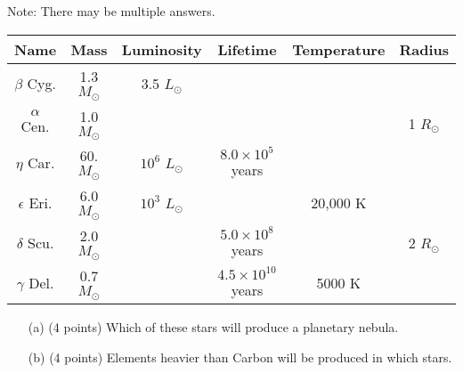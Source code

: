 \documentclass[12pt]{article}
\begin{document}
\begin{enumerate}
Note: There may be multiple answers.

\begin{tabular}{|c|c|c|c|c|c|}
\hline
Name & Mass & Luminosity & Lifetime & Temperature & Radius \\
\hline
$\beta$ Cyg. & 1.3 $M_\odot$ & 3.5 $L_\odot$ &  &  &  \\
\hline
$\alpha$ Cen. & 1.0 $M_\odot$ &  &  &  & 1 $R_\odot$ \\
\hline
$\eta$ Car. & 60. $M_\odot$ & $10^6$ $L_\odot$ & $8.0 \times 10^5$ years &  &  \\
\hline
$\epsilon$ Eri. & 6.0 $M_\odot$ & $10^3$ $L_\odot$ &  & 20,000 K &  \\
\hline
$\delta$ Scu. & 2.0 $M_\odot$ &  & $5.0 \times 10^8$ years &  & 2 $R_\odot$ \\
\hline
$\gamma$ Del. & 0.7 $M_\odot$ &  & $4.5 \times 10^{10}$ years & 5000 K &  \\
\hline
\end{tabular}

\begin{itemize}
\item [(a)] (4 points) Which of these stars will produce a planetary nebula.
\newline
\item [(b)] (4 points) Elements heavier than Carbon will be produced in which stars.
\end{itemize}
\end{enumerate}

\end{document}
